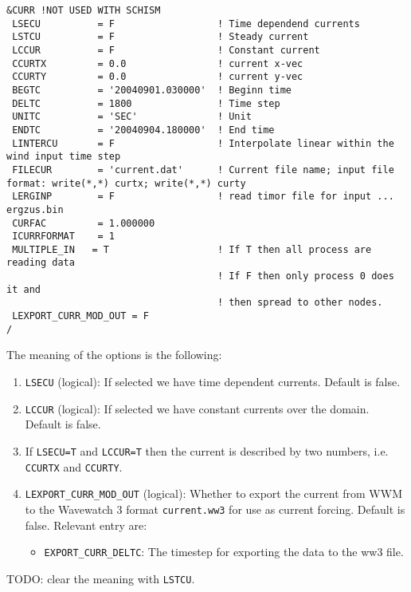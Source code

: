 \documentclass[12pt]{amsart}
\begin{document}
\begin{verbatim}
&CURR !NOT USED WITH SCHISM
 LSECU          = F                  ! Time dependend currents
 LSTCU          = F                  ! Steady current
 LCCUR          = F                  ! Constant current
 CCURTX         = 0.0                ! current x-vec
 CCURTY         = 0.0                ! current y-vec
 BEGTC          = '20040901.030000'  ! Beginn time
 DELTC          = 1800               ! Time step
 UNITC          = 'SEC'              ! Unit
 ENDTC          = '20040904.180000'  ! End time
 LINTERCU       = F                  ! Interpolate linear within the wind input time step
 FILECUR        = 'current.dat'      ! Current file name; input file format: write(*,*) curtx; write(*,*) curty
 LERGINP        = F                  ! read timor file for input ... ergzus.bin
 CURFAC         = 1.000000
 ICURRFORMAT    = 1
 MULTIPLE_IN   = T                   ! If T then all process are reading data
                                     ! If F then only process 0 does it and
                                     ! then spread to other nodes.
 LEXPORT_CURR_MOD_OUT = F
/
\end{verbatim}
The meaning of the options is the following:
\begin{enumerate}
\item {\tt LSECU} (logical): If selected we have time dependent currents. Default is false.
\item {\tt LCCUR} (logical): If selected we have constant currents over the domain. Default is false.
\item If {\tt LSECU=T} and {\tt LCCUR=T} then the current is described by two numbers, i.e. {\tt CCURTX} and {\tt CCURTY}.
\item {\tt LEXPORT\_CURR\_MOD\_OUT} (logical): Whether to export the current from WWM to the Wavewatch 3 format {\tt current.ww3} for use as current forcing. Default is false. Relevant entry are:
  \begin{itemize}
  \item {\tt EXPORT\_CURR\_DELTC}: The timestep for exporting the data to the ww3 file.
  \end{itemize}
\end{enumerate}
TODO: clear the meaning with {\tt LSTCU}.
\end{document}
